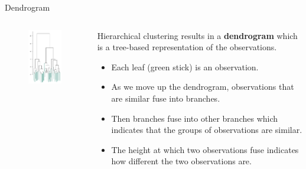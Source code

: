 \documentclass[
  ignorenonframetext,
  aspectratio=169,
]{beamer}
\begin{document}
\begin{frame}{Dendrogram}
\protect\hypertarget{dendrogram}{}
\begin{columns}[T]
\begin{column}{0.5\textwidth}
\begin{figure}

{\centering \includegraphics[width=1.80208in,height=\textheight]{images/dendrogram.png}

}

\end{figure}
\end{column}

\begin{column}{0.5\textwidth}
Hierarchical clustering results in a \textbf{dendrogram} which is a
tree-based representation of the observations.

\begin{itemize}
\item
  Each leaf (green stick) is an observation.
\item
  As we move up the dendrogram, observations that are similar fuse into
  branches.
\item
  Then branches fuse into other branches which indicates that the groups
  of observations are similar.
\item
  \alert{The height at which two observations fuse indicates how different the two observations are.}
\end{itemize}
\end{column}
\end{columns}
\end{frame}
\end{document}
